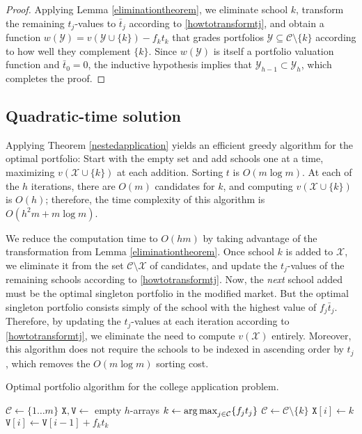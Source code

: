 \begin{proof}
Applying Lemma \ref{eliminationtheorem}, we eliminate school $k$, transform the remaining $t_j$-values to $\bar t_j$ according to \eqref{howtotransformtj}, and obtain a function $w(\mathcal{Y}) = v(\mathcal{Y} \cup \{k\}) - f_k t_k$ that grades portfolios $\mathcal{Y} \subseteq \mathcal{C} \setminus \{k\}$ according to how well they complement $\{k\}$. Since $w(\mathcal{Y})$ is itself a portfolio valuation function and $\bar t_0 = 0$, the inductive hypothesis implies that $\mathcal{Y}_{h-1} \subset \mathcal{Y}_h$, which completes the proof.
\end{proof}




\subsection{Quadratic-time solution} \label{sectionQuadTimeSoln}

Applying Theorem \ref{nestedapplication} yields an efficient greedy algorithm for the optimal portfolio: Start with the empty set and add schools one at a time, maximizing $v(\mathcal{X}\cup \{k\})$ at each addition. Sorting $t$ is  $O(m \log m)$.  At each of the $h$ iterations, there are $O(m)$ candidates for $k$, and computing $v(\mathcal{X}\cup \{k\})$ is $O(h)$; therefore, the time complexity of this algorithm is $O(h^2 m + m \log m)$. 

We reduce the computation time to $O(hm)$ by taking advantage of the transformation from Lemma \ref{eliminationtheorem}. Once school $k$ is added to $\mathcal{X}$, we eliminate it from the set $\mathcal{C}\setminus \mathcal{X}$ of candidates, and update the $t_j$-values of the remaining schools according to \eqref{howtotransformtj}. Now, the \emph{next} school added must be the optimal singleton portfolio in the modified market. But the optimal singleton portfolio consists simply of the school with the highest value of $f_j \bar t_j$. Therefore, by updating the $t_j$-values at each iteration according to \eqref{howtotransformtj}, we eliminate the need to compute $v(\mathcal{X})$ entirely. Moreover, this algorithm does not require the schools to be indexed in ascending order by $t_j$, which removes the $O(m\log m)$ sorting cost.

\begin{algorithm}[h] 
\caption{Optimal portfolio algorithm for the college application problem.} \label{algorithmforlargeh}
\KwIn{Utility values $t \in(0, \infty)^m$, admissions probabilities $f \in (0, 1]^m$, application limit $h \leq m$.}
$\mathcal{C} \gets \{1 \dots m\}$\;
$\mathtt{X, V} \gets $ empty $h$-arrays\;
{
    $k \gets \operatorname*{arg\,max}_{j \in \mathcal{C}}\{f_j t_j\}$\;
    $\mathcal{C} \gets \mathcal{C} \setminus \{k\}$\;
    $\mathtt{X}[i] \gets k$\;
     {$\mathtt{V}[i] \gets \mathtt{V}[i-1] + f_k t_k$}
	{
	}
}
\end{algorithm}


